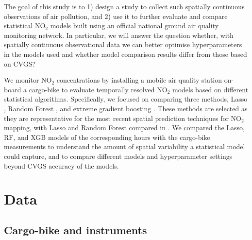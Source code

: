 \documentclass{article}
\begin{document}
The goal of this study is to 1) design a study to collect such spatially continuous observations of air pollution, and 2) use it to further evaluate and compare statistical NO$_2$ models built using an official national ground air quality monitoring network. In particular, we will answer the question whether, with spatially continuous observational data we can better optimise hyperparameters in the models used and whether model comparison results differ from those based on CVGS?


We monitor NO$_2$ concentrations by installing a mobile air quality station on-board a cargo-bike to evaluate temporally resolved NO$_2$ models based on different statistical algorithms. Specifically, we focused on comparing three methods, Lasso \citep{lasso}, Random Forest \citep[RF,][]{breiman2001random}, and extreme gradient boosting \citep[XGBoost, XGB,][]{xgboost}. These methods are selected as they are representative for the most recent spatial prediction techniques for NO$_2$ mapping, with Lasso and Random Forest compared in \cite{chen2019comparison, kerckhoffs2019performance, luglobal}. We compared the Lasso, RF, and XGB models of the corresponding hours with the cargo-bike measurements to understand the amount of spatial variability a statistical model could capture, and to compare different models and hyperparameter settings beyond CVGS accuracy of the models. %



\section{Data}

\subsection{Cargo-bike and instruments}
\end{document}
